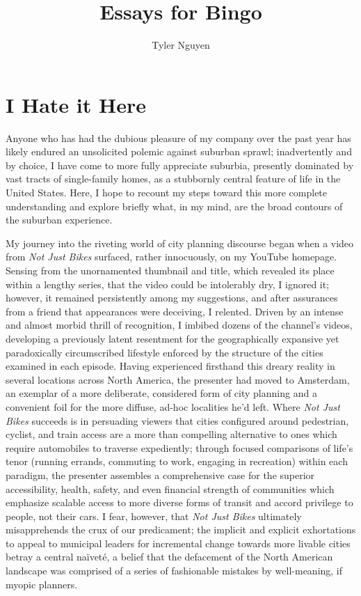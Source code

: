 \documentclass[oneside, a5paper]{book}
\begin{document}
\title{Essays for Bingo}
\author{Tyler Nguyen}
\maketitle
\chapter{I Hate it Here}
Anyone who has had the dubious pleasure of my company over the past year has likely endured an unsolicited polemic against suburban sprawl; inadvertently and by choice, I have come to more fully appreciate suburbia, presently dominated by vast tracts of single-family homes, as a stubbornly central feature of life in the United States. Here, I hope to recount my steps toward this more complete understanding and explore briefly what, in my mind, are the broad contours of the suburban experience.

My journey into the riveting world of city planning discourse began when a video from \textit{Not Just Bikes} surfaced, rather innocuously, on my YouTube homepage. Sensing from the unornamented thumbnail and title, which revealed its place within a lengthy series, that the video could be intolerably dry, I ignored it; however, it remained persistently among my suggestions, and after assurances from a friend that appearances were deceiving, I relented. Driven by an intense and almost morbid thrill of recognition, I imbibed dozens of the channel's videos, developing a previously latent resentment for the geographically expansive yet paradoxically circumscribed lifestyle enforced by the structure of the cities examined in each episode. Having experienced firsthand this dreary reality in several locations across North America, the presenter had moved to Amsterdam, an exemplar of a more deliberate, considered form of city planning and a convenient foil for the more diffuse, ad-hoc localities he'd left. Where \textit{Not Just Bikes} succeeds is in persuading viewers that cities configured around pedestrian, cyclist, and train access are a more than compelling alternative to ones which require automobiles to traverse expediently; through focused comparisons of life's tenor (running errands, commuting to work, engaging in recreation) within each paradigm, the presenter assembles a comprehensive case for the superior accessibility, health, safety, and even financial strength of communities which emphasize scalable access to more diverse forms of transit and accord privilege to people, not their cars. I fear, however, that \textit{Not Just Bikes} ultimately misapprehends the crux of our predicament; the implicit and explicit exhortations to appeal to municipal leaders for incremental change towards more livable cities betray a central na\"ivet\'e, a belief that the defacement of the North American landscape was comprised of a series of fashionable mistakes by well-meaning, if myopic planners.
\end{document}
